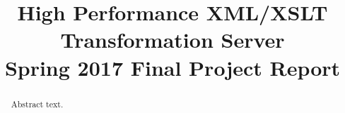 


\title{
	High Performance XML/XSLT Transformation Server \\
    {
    	\LARGE Spring 2017 Final Project Report
    }
}
\author{
}



\maketitle
\begin{abstract}
  Abstract text.
\end{abstract}

\tableofcontents




















